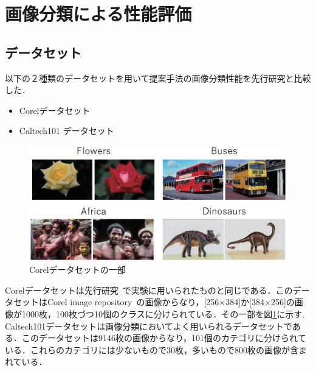 

\section{画像分類による性能評価}
\subsection{データセット}
以下の２種類のデータセットを用いて提案手法の画像分類性能を先行研究と比較した．
\begin{itemize}
	\item Corelデータセット~\cite{Corel}
	\item Caltech101 データセット~\cite{Caltech101}
\end{itemize}
\begin{figure}[tb]
\begin{center}
\includegraphics[clip, width=\columnwidth]{image/dataset.eps}
\caption{Corelデータセットの一部}
\label{fig:image/dataset.eps}
\end{center}
\end{figure}
Corelデータセットは先行研究~\cite{NMD}で実験に用いられたものと同じである．このデータセットはCorel image repository~\cite{Corel}の画像からなり，[256×384]か[384×256]の画像が1000枚，100枚づつ10個のクラスに分けられている．その一部を図\ref{fig:image/dataset.eps}に示す.
Caltech101データセットは画像分類においてよく用いられるデータセットである．このデータセットは9146枚の画像からなり，101個のカテゴリに分けられている．これらのカテゴリには少ないもので30枚，多いもので800枚の画像が含まれている．
